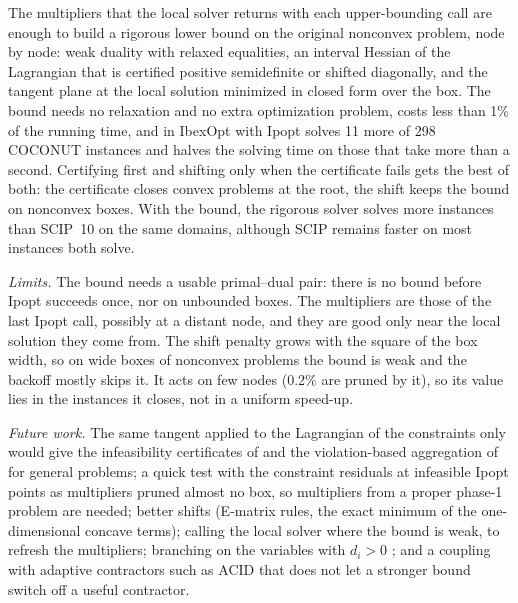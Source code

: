 \documentclass[11pt]{article}
\begin{document}
The multipliers that the local solver returns with each upper-bounding call are
enough to build a rigorous lower bound on the original nonconvex problem, node by
node: weak duality with relaxed equalities, an interval Hessian of the Lagrangian that
is certified positive semidefinite or shifted diagonally, and the tangent plane at the
local solution minimized in closed form over the box. The bound needs no relaxation
and no extra optimization problem, costs less than 1\% of the running time, and in
IbexOpt with Ipopt solves 11 more of 298 COCONUT instances and halves the solving time
on those that take more than a second. Certifying first and shifting only when the
certificate fails gets the best of both: the certificate closes convex problems at the
root, the shift keeps the bound on nonconvex boxes. With the bound, the rigorous
solver solves more instances than SCIP~10 on the same domains, although SCIP remains
faster on most instances both solve.

\emph{Limits.} The bound needs a usable primal--dual pair: there is no bound before
Ipopt succeeds once, nor on unbounded boxes. The multipliers are those of the last
Ipopt call, possibly at a distant node, and they are good only near the local solution
they come from. The shift penalty grows with the square of the box width, so on wide
boxes of nonconvex problems the bound is weak and the backoff mostly skips it. It acts
on few nodes (0.2\% are pruned by it), so its value lies in the instances it closes,
not in a uniform speed-up.

\emph{Future work.} The same tangent applied to the Lagrangian of the constraints
only would give the infeasibility certificates of \citet[Sect.~20]{Neumaier2004} and
the violation-based aggregation of \citet{DomesNeumaier2016} for general problems; a
quick test with the constraint residuals at infeasible Ipopt points as multipliers
pruned almost no box, so multipliers from a proper phase-1 problem are needed; better
shifts (E-matrix rules, the exact minimum of the
one-dimensional concave terms); calling the local solver where the bound is weak, to
refresh the multipliers; branching on the variables with $d_i > 0$
\citep{Adjiman1998b}; and a coupling with adaptive contractors such as ACID that does
not let a stronger bound switch off a useful contractor.



\end{document}

